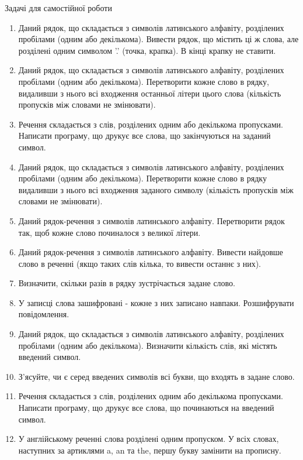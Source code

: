 \documentclass[]{article}
\begin{document}
Задачі для самостійної роботи

\begin{enumerate}
\def\labelenumi{\arabic{enumi})}
\item
  Даний рядок, що складається з символів латинського алфавіту,
  розділених пробілами (одним або декількома). Вивести рядок, що містить
  ці ж слова, але розділені одним символом '.' (точка, крапка). В кінці
  крапку не ставити.
\item
  Даний рядок, що складається з символів латинського алфавіту,
  розділених пробілами (одним або декількома). Перетворити кожне слово в
  рядку, видаливши з нього всі входження останньої літери цього слова
  (кількість пропусків між словами не змінювати).
\item
  Речення складається з слів, розділених одним або декількома
  пропусками. Написати програму, що друкує все слова, що закінчуються на
  заданий символ.
\item
  Даний рядок, що складається з символів латинського алфавіту,
  розділених пробілами (одним або декількома). Перетворити кожне слово в
  рядку видаливши з нього всі входження заданого символу (кількість
  пропусків між словами не змінювати).
\item
  Даний рядок-речення з символів латинського алфавіту. Перетворити рядок
  так, щоб кожне слово починалося з великої літери.
\item
  Даний рядок-речення з символів латинського алфавіту. Вивести найдовше
  слово в реченні (якщо таких слів кілька, то вивести останнє з них).
\item
  Визначити, скільки разів в рядку зустрічається задане слово.
\item
  \protect\hypertarget{_Hlk65949361}{}{}У записці слова зашифровані -
  кожне з них записано навпаки. Розшифрувати повідомлення.
\item
  Даний рядок, що складається з символів латинського алфавіту,
  розділених пробілами (одним або декількома). Визначити кількість слів,
  які містять введений символ.
\item
  З'ясуйте, чи є серед введених символів всі букви, що входять в задане
  слово.
\item
  Речення складається з слів, розділених одним або декількома
  пропусками. Написати програму, що друкує все слова, що починаються на
  введений символ.
\item
  У англійському реченні слова розділені одним пропуском. У всіх словах,
  наступних за артиклями a, an та the, першу букву замінити на прописну.

\end{enumerate}
\end{document}
